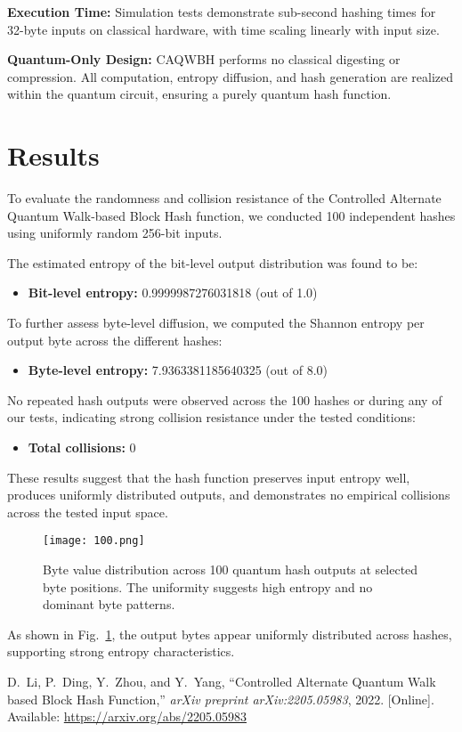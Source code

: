 \documentclass[conference]{IEEEtran}
\begin{document}
\textbf{Execution Time:} Simulation tests demonstrate sub-second hashing times for 32-byte inputs on classical hardware, with time scaling linearly with input size.

\textbf{Quantum-Only Design:} CAQWBH performs no classical digesting or compression. All computation, entropy diffusion, and hash generation are realized within the quantum circuit, ensuring a purely quantum hash function.

\section{Results}

To evaluate the randomness and collision resistance of the Controlled Alternate Quantum Walk-based Block Hash function, we conducted 100 independent hashes using uniformly random 256-bit inputs.

The estimated entropy of the bit-level output distribution was found to be:
\begin{itemize}
    \item \textbf{Bit-level entropy:} 0.9999987276031818 (out of 1.0)
\end{itemize}

To further assess byte-level diffusion, we computed the Shannon entropy per output byte across the different hashes:
\begin{itemize}
    \item \textbf{Byte-level entropy:}  7.9363381185640325 (out of 8.0)
\end{itemize}

No repeated hash outputs were observed across the 100 hashes or during any of our tests, indicating strong collision resistance under the tested conditions:
\begin{itemize}
    \item \textbf{Total collisions:} 0
\end{itemize}

These results suggest that the hash function preserves input entropy well, produces uniformly distributed outputs, and demonstrates no empirical collisions across the tested input space.

\begin{figure}[!t]
    \centering
    \texttt{[image: 100.png]}
    \caption{Byte value distribution across 100 quantum hash outputs at selected byte positions. The uniformity suggests high entropy and no dominant byte patterns.}
    \label{fig:byte_distribution}
\end{figure}

As shown in Fig.~\ref{fig:byte_distribution}, the output bytes appear uniformly distributed across hashes, supporting strong entropy characteristics.


\begin{thebibliography}{1}

D.~Li, P.~Ding, Y.~Zhou, and Y.~Yang, ``Controlled Alternate Quantum Walk based Block Hash Function,'' \textit{arXiv preprint arXiv:2205.05983}, 2022. [Online]. Available: \url{https://arxiv.org/abs/2205.05983}

\end{thebibliography}
\end{document}

